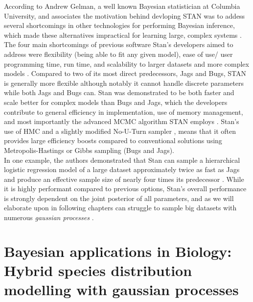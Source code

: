 \documentclass[
  12pt,
]{book}
\theoremstyle{definition}
\theoremstyle{definition}
\theoremstyle{definition}
\theoremstyle{remark}
\begin{document}
According to Andrew Gelman, a well known Bayesian statistician at Columbia University, and associates the motivation behind devloping STAN was to addess several shortcomings in other technologies for performing Bayesian inference, which made these alternatives impractical for learning large, complex systems \citep{Gelman2015}.
The four main shortcomings of previous software Stan's developers aimed to address were flexibility (being able to fit any given model), ease of use/ user programming time, run time, and scalability to larger datasets and more complex models \citep{Gelman2015}.
Compared to two of its most direct predecessors, Jags and Bugs, STAN is generally more flexible although notably it cannot handle discrete parameters while both Jags and Bugs can.
Stan was demonstrated to be both faster and scale better for complex models than Bugs and Jags, which the developers contribute to general efficiency in implementation, use of memory management, and most importantly the advanced MCMC algorithm STAN employs \citep{Gelman2015}.
Stan's use of HMC \citep{Brooks2011} and a slightly modified No-U-Turn sampler \citep{Homan2014}, means that it often provides large efficiency boosts compared to conventional solutions using Metropolis-Hastings or Gibbs sampling (Bugs and Jags).\\
In one example, the authors demonstrated that Stan can sample a hierarchical logistic regression model of a large dataset approximately twice as fast as Jags and produce an effective sample size of nearly four times its predecessor \citep{Gelman2015}.
While it is highly performant compared to previous options, Stan's overall performance is strongly dependent on the joint posterior of all parameters, and as we will elaborate upon in following chapters can struggle to sample big datasets with numerous \emph{gaussian processes} \citep{Gelman2015}.

\hypertarget{bayesian-applications-in-biology-hybrid-species-distribution-modelling-with-gaussian-processes}{%
\chapter{Bayesian applications in Biology: Hybrid species distribution modelling with gaussian processes}\label{bayesian-applications-in-biology-hybrid-species-distribution-modelling-with-gaussian-processes}}

  
\end{document}
